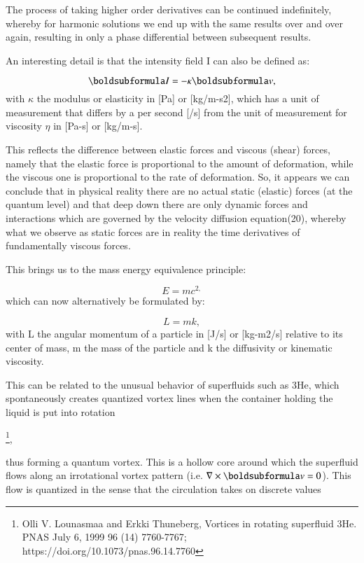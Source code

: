 \documentclass[twoside,final]{article}
\begin{document}
{The process of taking higher order derivatives can be continued indefinitely,
whereby for harmonic solutions we end up with the same results over and over
again, resulting in only a phase differential between subsequent results.  

An interesting detail is that the intensity field I can also be defined as:

\begin{equation}\label{seq:refText26}
\boldsubformula I=-\kappa \boldsubformula v,
\end{equation}
with $\kappa $ the modulus or elasticity in [Pa] or [kg/m-s2], which has a unit
of measurement that differs by a per second [/s] from the unit of measurement
for viscosity $\eta $ in [Pa-s] or [kg/m-s].

This reflects the difference between elastic forces and viscous (shear) forces,
namely that the  elastic force is proportional to the amount of deformation,
while the viscous one is proportional to the rate of deformation. So, it appears
we can conclude that in physical reality there are no actual static (elastic)
forces (at the quantum level) and that deep down there are only dynamic forces
and interactions which are governed by the velocity diffusion equation(20),
whereby what we observe as static forces are in reality the time derivatives of
fundamentally viscous forces.

This brings us to the mass energy equivalence principle:

\begin{equation}
E=\mathit{mc}^{2,}
\end{equation}
which can now alternatively be formulated by:

\begin{equation}\label{seq:refText28}
L=mk,
\end{equation}
with L the angular momentum of a particle in [J/s] or [kg-m2/s] relative to its center of mass, m the mass of the
particle and k the diffusivity or kinematic viscosity. 

This can be related to the unusual behavior of superfluids such as 3He, which
spontaneously creates quantized vortex lines when the container holding the
liquid is put into rotation

\footnote{  Olli V. Lounasmaa and Erkki Thuneberg,
Vortices in rotating superfluid 3He. PNAS July 6, 1999 96 (14) 7760-7767;
https://doi.org/10.1073/pnas.96.14.7760 \par }, 

thus forming a quantum vortex.
This is a hollow core around which the superfluid flows along an irrotational
vortex pattern (i.e. $\nabla \times \boldsubformula v=0$). This flow is
quantized in the sense that the circulation takes on discrete values

}
\end{document}
